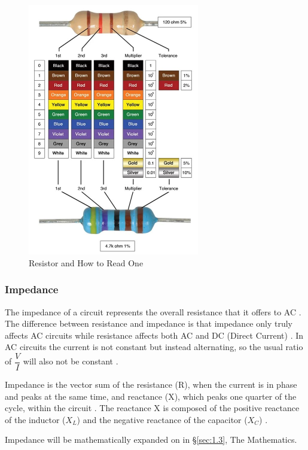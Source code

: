 \documentclass[12pt]{article}
\begin{document}
\begin{figure}[H]
    \centering
    \includegraphics[width=7.5cm]{resistorr.jpg}
    \caption{\centering \footnotesize{Resistor and How to Read One \protect\cite{resistorpic}}}
    \label{fig:resistor}
\end{figure}

\subsubsection{Impedance} \label{sec:1.1.2}

The impedance of a circuit represents the overall resistance that it offers to AC
\cite{lionimpedance}.
The difference between resistance and impedance is that impedance only truly affects AC circuits while resistance affects both AC and DC (Direct Current)
\cite{isaacimpedance,protimpedance}.
In AC circuits the current is not constant but instead alternating, so the usual ratio of $\dfrac{V}{I}$ will also not be constant
\cite{isaacimpedance}.

Impedance is the vector sum of the resistance (R), when the current is in phase and peaks at the same time, and reactance (X), which peaks one quarter of the cycle,
within the circuit
\cite{lionimpedance,isaacimpedance}.
The reactance X is composed of the positive reactance of the inductor ($X_L$) and the negative reactance of the capacitor ($X_C$)
\cite{isaacimpedance}.

Impedance will be mathematically expanded on in §\ref{sec:1.3}, The Mathematics.
\end{document}
